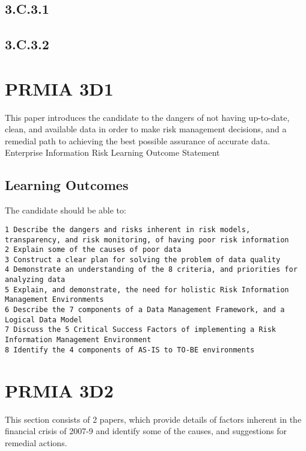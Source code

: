 \documentclass[12pt]{article}
\begin{document}
\subsection{3.C.3.1}
\subsection{3.C.3.2}
\newpage
\section{PRMIA 3D1}
 
This paper introduces the candidate to the dangers of not having up-to-date, clean, and available data in
order to make risk management decisions, and a remedial path to achieving the best possible assurance
of accurate data.
Enterprise Information Risk Learning Outcome Statement
\subsection{Learning Outcomes}
The candidate should be able to:
\begin{verbatim}
1 Describe the dangers and risks inherent in risk models, transparency, and risk monitoring, of having poor risk information
2 Explain some of the causes of poor data
3 Construct a clear plan for solving the problem of data quality
4 Demonstrate an understanding of the 8 criteria, and priorities for analyzing data
5 Explain, and demonstrate, the need for holistic Risk Information Management Environments
6 Describe the 7 components of a Data Management Framework, and a Logical Data Model
7 Discuss the 5 Critical Success Factors of implementing a Risk Information Management Environment
8 Identify the 4 components of AS-IS to TO-BE environments
\end{verbatim}

\section{PRMIA 3D2}
 
This section consists of 2 papers, which provide details of factors inherent in the financial crisis of 2007-9 and
identify some of the causes, and suggestions for remedial actions.
 
\end{document}
